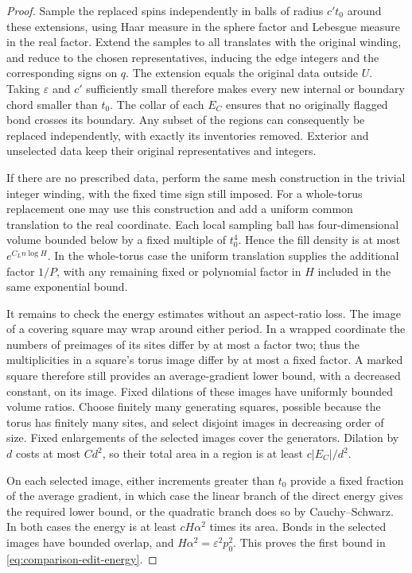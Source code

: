 \begin{proof}
Sample the replaced spins independently in balls of radius \(c't_0\)
around these extensions, using Haar measure in the sphere factor and
Lebesgue measure in the real factor.  Extend the samples to all
translates with the original winding, and reduce to the chosen
representatives, inducing the edge integers and the corresponding
signs on \(q\).  The extension equals the original data outside \(U\).
Taking \(\varepsilon\) and \(c'\) sufficiently small therefore makes
every new internal or boundary chord smaller than \(t_0\).  The collar
of each \(E_C\) ensures that no originally flagged bond crosses its
boundary.  Any subset of the regions can consequently be replaced
independently, with exactly its inventories removed.  Exterior and
unselected data keep their original representatives and integers.

If there are no prescribed data, perform the same mesh construction in
the trivial integer winding, with the fixed time sign still imposed.
For a whole-torus replacement one may use this construction and add a
uniform common translation to the real coordinate.  Each local sampling
ball has four-dimensional volume bounded below by a fixed multiple of
\(t_0^4\).  Hence the fill density is at most \(e^{C_Ln\log H}\).
In the whole-torus case the uniform translation supplies the additional
factor \(1/P\), with any remaining fixed or polynomial factor in \(H\)
included in the same exponential bound.

It remains to check the energy estimates without an aspect-ratio loss.
The image of a covering square may wrap around either period.  In a
wrapped coordinate the numbers of preimages of its sites differ by at
most a factor two; thus the multiplicities in a square's torus image
differ by at most a fixed factor.  A marked square therefore still
provides an average-gradient lower bound, with a decreased constant,
on its image.  Fixed dilations of these images have uniformly bounded
volume ratios.  Choose finitely many generating squares, possible
because the torus has finitely many sites, and select disjoint images
in decreasing order of size.  Fixed enlargements of the selected images
cover the generators.  Dilation by \(d\) costs at most \(Cd^2\), so their
total area in a region is at least \(c|E_C|/d^2\).

On each selected image, either increments greater than \(t_0\) provide
a fixed fraction of the average gradient, in which case the linear
branch of the direct energy gives the required lower bound, or the
quadratic branch does so by Cauchy--Schwarz.  In both cases the energy
is at least \(cH\alpha^2\) times its area.  Bonds in the selected
images have bounded overlap, and \(H\alpha^2=\varepsilon^2p_0^2\).
This proves the first bound in \eqref{eq:comparison-edit-energy}.


\end{proof}
